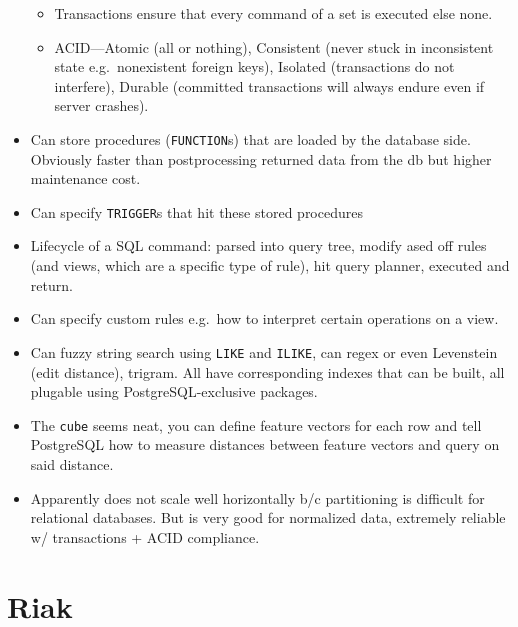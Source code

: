 \documentclass[10pt]{article}
\begin{document}
\begin{itemize}
\begin{itemize}
            \item Transactions ensure that every command of a set is executed
                else none.
            \item ACID---Atomic (all or nothing), Consistent (never stuck in
                inconsistent state e.g.\ nonexistent foreign keys), Isolated
                (transactions do not interfere), Durable (committed transactions
                will always endure even if server crashes).
        \end{itemize}
    \item Can store procedures (\lstinline{FUNCTION}s) that are loaded by the
        database side. Obviously faster than postprocessing returned data from
        the db but higher maintenance cost.
    \item Can specify \lstinline{TRIGGER}s that hit these stored procedures
    \item Lifecycle of a SQL command: parsed into query tree, modify ased off
        rules (and views, which are a specific type of rule), hit query planner,
        executed and return.
    \item Can specify custom rules e.g.\ how to interpret certain operations on
        a view.
    \item Can fuzzy string search using \lstinline{LIKE} and \lstinline{ILIKE},
        can regex or even Levenstein (edit distance), trigram. All have
        corresponding indexes that can be built, all plugable using
        PostgreSQL-exclusive packages.
    \item The \lstinline{cube} seems neat, you can define feature vectors for
        each row and tell PostgreSQL how to measure distances between feature
        vectors and query on said distance.
    \item Apparently does not scale well horizontally b/c partitioning is
        difficult for relational databases. But is very good for normalized
        data, extremely reliable w/ transactions + ACID compliance.
\end{itemize}

\section{Riak}
\end{document}
